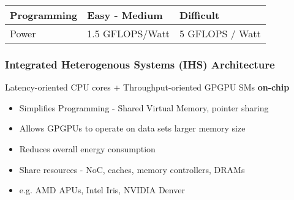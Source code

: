 \documentclass{beamer}
\begin{document}
\begin{frame}
\begin{table}[]
\begin{tabular}{@{}lll@{}}
	Programming                                                           & Easy - Medium                                                                                    & Difficult                                                                                     \\ \midrule
	Power                                                                 & 1.5 GFLOPS/Watt                                                                                  & 5 GFLOPS / Watt                                                                               \\ \bottomrule
\end{tabular}
\label{cpu-vs-gpu}
\end{table}
\end{frame}


\begin{frame}
\frametitle{Integrated Heterogenous Systems (IHS) Architecture}
Latency-oriented CPU cores + Throughput-oriented GPGPU SMs \textbf{on-chip} \\
\begin{itemize}
	\item Simplifies Programming - Shared Virtual Memory, pointer sharing
	\item Allows GPGPUs to operate on data sets larger memory size %
	\item Reduces overall energy consumption
	\item Share resources - NoC, caches, memory controllers, DRAMs
	\item e.g. AMD APUs, Intel Iris, NVIDIA Denver
\end{itemize}
\begin{figure}[!htb]
	\centering
	\def\svgwidth{0.6\columnwidth}
	
	\label{fig:hsa-arch}
\end{figure}
\end{frame}

\end{document}
